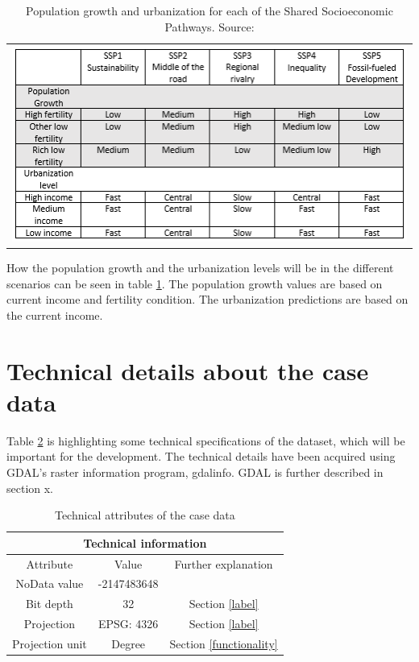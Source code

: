\begin{table}[htbp]
	\centering
	\begin{tabular}{l}
		\includegraphics[width=1\textwidth]{Pictures/SSPTable}
	\end{tabular}
	\caption{Population growth and urbanization for each of the Shared Socioeconomic Pathways. Source: \citet{WhyDetailedPop}}
	\label{SSPTable}
\end{table}

How the population growth and the urbanization levels will be in the different scenarios can be seen in table \ref{SSPTable}. The population growth values are based on current income and fertility condition. The urbanization predictions are based on the current income.

\section{Technical details about the case data}

Table \ref{tabTech} is highlighting some technical specifications of the dataset, which will be important for the development. The technical details have been acquired using GDAL's raster information program, gdalinfo. GDAL is further described in section x.

\begin{table}[h]%
	\centering
\begin{tabular}{|c|c|c|}
	\hline 
	\multicolumn{3}{|c|}{Technical information} \\ 
	\hline 
	Attribute & Value & Further explanation \\ 
	\hline 
	NoData value & -2147483648 &  \\ 
	\hline 
	Bit depth & 32 &  Section \ref{label}\\ 
	\hline 
	Projection & EPSG: 4326 &  Section \ref{label}\\ 
	\hline 
	Projection unit & Degree & Section \ref{functionality}  \\ 
	\hline 
\end{tabular}
\caption{Technical attributes of the case data}
 \label{tabTech}
\end{table}

